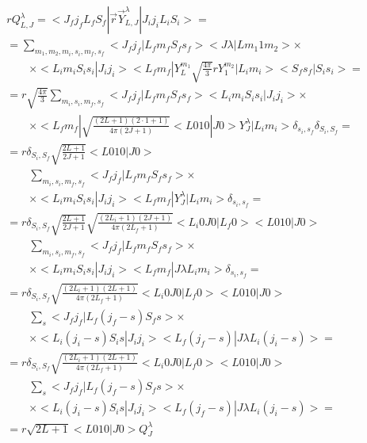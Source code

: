 \begin{align}
    \begin{split}
        &r Q_{L, J}^\lambda = <J_f j_f L_f S_f|\vec{r} \vec{Y}^{\lambda}_{L, J}|J_i j_i L_i S_i> = \\
        &= \sum_{m_1, m_2, m_i, s_i, m_f, s_f} <J_f j_f| L_f m_f S_f s_f> <J \lambda| L m_1 1 m_2> \times \\
        &\qquad\times <L_i m_i S_i s_i | J_i j_i> <L_f m_f| Y_L^{m_1} \sqrt{\frac{4 \pi}{3}} r Y_{1}^{m_2}|L_i m_i> <S_f s_f|S_i s_i> = \\
        &= r \sqrt{\frac{4 \pi}{3}} \sum_{m_i, s_i, m_f, s_f} <J_f j_f| L_f m_f S_f s_f> <L_i m_i S_i s_i | J_i j_i> \times \\
        &\qquad\times <L_f m_f| \sqrt{\frac{(2L+1)(2\cdot1+1)}{4 \pi (2J + 1)}} <L 0 1 0 | J 0> Y_J^\lambda|L_i m_i> \delta_{s_i, s_f} \delta_{S_i, S_f} = \\
        &= r \delta_{S_i, S_f} \sqrt{\frac{2L+1}{2J+1}} <L 0 1 0 | J 0> \\
        &\qquad\sum_{m_i, s_i, m_f, s_f} <J_f j_f| L_f m_f S_f s_f> \times \\
        &\qquad\times <L_i m_i S_i s_i | J_i j_i> <L_f m_f| Y_J^\lambda |L_i m_i> \delta_{s_i, s_f} = \\
        &= r \delta_{S_i, S_f} \sqrt{\frac{2L+1}{2J+1}} \sqrt{\frac{(2L_i+1)(2J+1)}{4 \pi (2L_f+1)}} <L_i 0 J 0 | L_f 0> <L 0 1 0 | J 0> \\
        &\qquad \sum_{m_i, s_i, m_f, s_f} <J_f j_f| L_f m_f S_f s_f> \times \\
        &\qquad\times <L_i m_i S_i s_i | J_i j_i> <L_f m_f| J \lambda L_i m_i> \delta_{s_i, s_f} = \\
        &= r \delta_{S_i, S_f} \sqrt{\frac{(2L_i+1)(2L+1)}{4 \pi (2L_f+1)}} <L_i 0 J 0 | L_f 0> <L 0 1 0 | J 0> \\
        &\qquad \sum_{s} <J_f j_f| L_f (j_f - s) S_f s> \times \\
        &\qquad\times <L_i (j_i - s) S_i s | J_i j_i> <L_f (j_f - s)| J \lambda L_i (j_i - s)> = \\
        &= r \delta_{S_i, S_f} \sqrt{\frac{(2L_i+1)(2L+1)}{4 \pi (2L_f+1)}} <L_i 0 J 0 | L_f 0> <L 0 1 0 | J 0> \\
        &\qquad \sum_{s} <J_f j_f| L_f (j_f - s) S_f s> \times \\
        &\qquad\times <L_i (j_i - s) S_i s | J_i j_i> <L_f (j_f - s)| J \lambda L_i (j_i - s)> = \\
        &=r \sqrt{2L+1} <L 0 1 0 | J 0> Q_{J}^{\lambda}
    \end{split}
\end{align}

